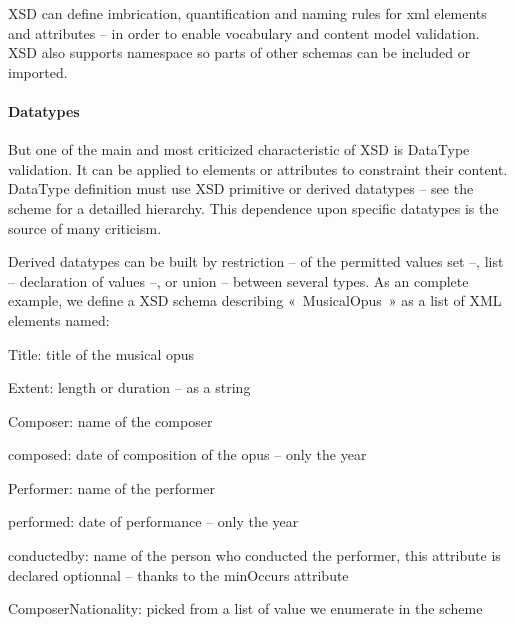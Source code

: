 XSD can define imbrication, quantification and naming rules for xml elements and attributes – in order to enable vocabulary and content model validation. XSD also supports namespace so parts of other schemas can be included or imported. 

\paragraph{Datatypes}
But one of the main and most criticized characteristic of XSD is DataType validation. It can be applied to elements or attributes to constraint their content.  DataType definition must use XSD primitive or derived datatypes – see the scheme for a detailled hierarchy. This dependence upon specific datatypes is the source of many criticism. 

Derived datatypes can be built by restriction – of the permitted values set –, list – declaration of values –, or union – between several types. 
As an complete example, we define a XSD schema describing « MusicalOpus » as a list of XML elements named:
\begin{liste}
	\item Title: title of the musical opus
	\item Extent: length or duration – as a string
	\item Composer: name of the composer
	\item composed: date of composition of the opus – only the year
	\item Performer: name of the performer
	\item performed: date of performance – only the year
	\item conductedby: name of the person who conducted the performer, this attribute is declared optionnal – thanks to the minOccurs attribute
	\item ComposerNationality: picked from a list of value we enumerate in the scheme
\end{liste}

